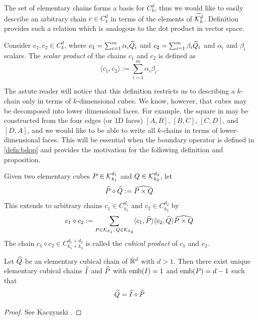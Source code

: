 The set of elementary chains forms a basis for $C_k^d$, thus we would like to easily describe an arbitrary chain $c \in C_k^d$ in terms of the elements of $\widehat{\mathcal{K}^{d}_k}$. Definition  provides such a relation which is analogous to the dot product in vector space.

\begin{defn} \label{defn:chainprod}
	Consider $c_1, c_2 \in C_k^d$, where $c_1 = \sum_{i=1}^m \alpha_i \widehat{Q}_i $ and $ c_2 = \sum_{i=1}^m \beta_i \widehat{Q}_i $ and $\alpha_i$ and $\beta_i$ scalars. The \textit{scalar product} of the chains $c_1$ and $c_2$ is defined as
	$$ \langle c_1, c_2 \rangle := \sum_{i=1}^m \alpha_i \beta_i . $$
\end{defn}

The astute reader will notice that this definition restricts us to describing a $k$-chain only in terms of $k$-dimensional cubes. We know, however, that cubes may be decomposed into lower dimensional faces. For example, the square in  may be constructed from the four edges (or 1D faces) $[A,B]$, $[B,C]$, $[C,D]$, and $[D,A]$, and we would like to be able to write all $k$-chains in terms of lower-dimensional faces. This will be essential when the boundary operator is defined in \ref{defn:bdop} and provides the motivation for the following definition and proposition.

\begin{defn}
	Given two elementary cubes $P \in \mathcal{K}_{k_1}^{d_1} $ and $ Q \in \mathcal{K}_{k_2}^{d_2} $, let
	$$ \widehat{P} \diamond \widehat{Q} := \widehat{ P \times Q } $$
	This extends to arbitrary chains $ c_1 \in C_{k_1}^{d_1} $ and $ c_2 \in C_{k_2}^{d_2} $ by
	$$ c_1 \diamond c_2 := \sum_{P \in \mathcal{K}_{k_1}, \, Q \in \mathcal{K}_{k_2} } \langle c_1, \widehat{P} \rangle \langle c_2, \widehat{Q} \rangle \widehat{ P \times Q} $$
	The chain $ c_1 \diamond c_2 \in C_{k_1 + k_2}^{d_1 + d_2} $ is called the \textit{cubical product} of $c_1$ and $c_2$.
\end{defn}

\begin{prop} \label{prop:chainprod}
	Let $\widehat{Q}$ be an elementary cubical chain of $\mathbb{R}^d$ with $d > 1$. Then there exist unique elementary cubical chains $\widehat{I}$ and $\widehat{P}$ with $\mathord{\mathrm{emb}(I)} = 1$ and $\mathord{\mathrm{emb}(P)} = d - 1$ such that
	$$ \widehat{Q} = \widehat{I} \diamond \widehat{P} $$
\end{prop}
%
\begin{proof}
	See Kaczynski \etal{}.
\end{proof}

